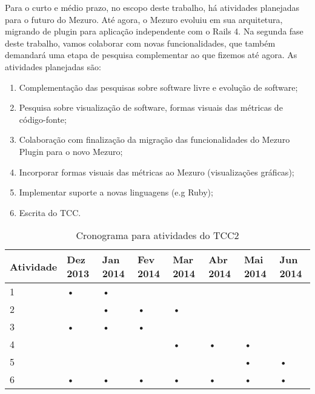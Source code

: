 Para o curto e médio prazo, no escopo deste trabalho, há atividades planejadas para o futuro do Mezuro. Até agora, o Mezuro evoluiu em sua arquitetura, migrando de plugin para aplicação independente com o Rails 4. Na segunda fase deste trabalho, vamos colaborar com novas funcionalidades, que também demandará uma etapa de pesquisa complementar ao que fizemos até agora. As atividades planejadas são:

\begin{enumerate}
\item Complementação das pesquisas sobre software livre e evolução de software;
\item Pesquisa sobre visualização de software, formas visuais das métricas de código-fonte;
\item Colaboração com finalização da migração das funcionalidades do Mezuro Plugin para o novo Mezuro;
\item Incorporar formas visuais das métricas ao Mezuro (visualizações gráficas);
\item Implementar suporte a novas linguagens (e.g Ruby);
\item Escrita do TCC.
\end{enumerate}

\begin{table}[H]
\begin{center}
    \begin{tabular}{ | l | l | l | l | l | l | l | l |}
    \hline
    Atividade & Dez 2013 & Jan 2014 & Fev 2014 & Mar 2014 & Abr 2014 & Mai 2014 & Jun 2014 \\ \hline
    1 & • & • &   &   &   &   &   \\ \hline
    2 &   & • & • & • &   &   &   \\ \hline
    3 & • & • & • &   &   &   &   \\ \hline
    4 &   &   &   & • & • & • &   \\ \hline
    5 &   &   &   &   &   & • & • \\ \hline
    6 & • & • & • & • & • & • & • \\ \hline
    \end{tabular}
    \caption{Cronograma para atividades do TCC2}
    \label{tab-cronograma}
\end{center}
\end{table}


